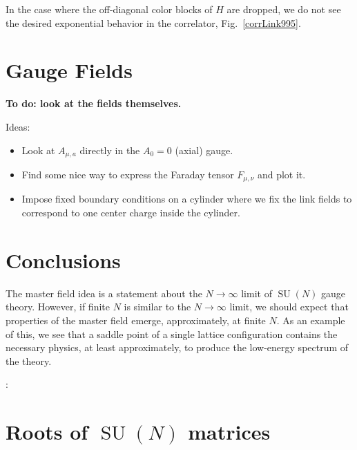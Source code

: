 \documentclass[preprint,aps,prd]{revtex4-2}
\DeclareMathOperator{\SU}{SU}
\begin{document}
In the case where the off-diagonal color blocks of $H$ are dropped,
we do not see the desired exponential behavior in the correlator,
Fig.~\ref{corrLink995}.

\section{Gauge Fields}

{\bf To do:  look at the fields themselves.

  Ideas:
  \begin{itemize}
  \item  Look at $A_{\mu,a}$ directly in the $A_0=0$ (axial) gauge.

  \item Find some nice way to express the Faraday tensor $F_{\mu,\nu}$ and
    plot it.

  \item Impose fixed boundary conditions on a cylinder where we fix the
    link fields to correspond to one center charge inside the
    cylinder.
    
  \end{itemize}
}


\section{Conclusions}

The master field idea is a statement about the $N\to \infty$ limit
of $\SU(N)$ gauge theory.  However, if finite $N$ is similar
to the $N\to\infty$ limit, we should expect that properties of
the master field emerge, approximately, at finite $N$.
As an example of this, we
see that a saddle point of a single lattice configuration
contains the necessary physics, at least approximately, to produce the
low-energy spectrum of the theory.

\vspace{10mm}
:

\appendix

\section{Roots of $\SU(N)$ matrices}
\label{roots}
\end{document}
